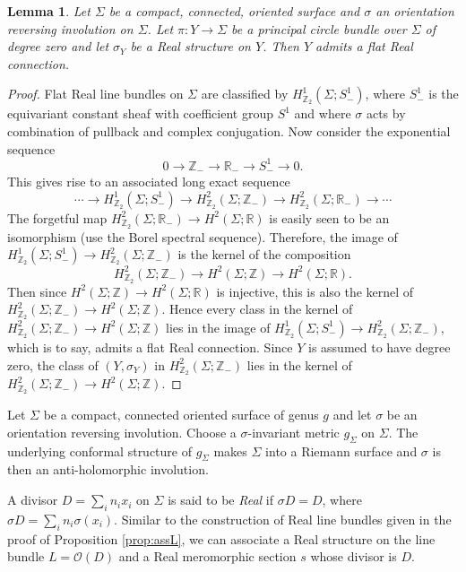 \documentclass{amsart}
\newtheorem{lemma}[theorem]{Lemma}
\theoremstyle{definition}
\theoremstyle{remark}
\numberwithin{equation}{section}
\begin{document}
\begin{lemma}\label{lem:flatreal}
Let $\Sigma$ be a compact, connected, oriented surface and $\sigma$ an orientation reversing involution on $\Sigma$. Let $\pi : Y \to \Sigma$ be a principal circle bundle over $\Sigma$ of degree zero and let $\sigma_Y$ be a Real structure on $Y$. Then $Y$ admits a flat Real connection.
\end{lemma}
\begin{proof}
Flat Real line bundles on $\Sigma$ are classified by $H^1_{\mathbb{Z}_2}(\Sigma ; S^1_-)$, where $S^1_-$ is the equivariant constant sheaf with coefficient group $S^1$ and where $\sigma$ acts by combination of pullback and complex conjugation. Now consider the exponential sequence
\[
0 \to \mathbb{Z}_- \to \mathbb{R}_- \to S^1_- \to 0.
\]
This gives rise to an associated long exact sequence
\[
\cdots \to H^1_{\mathbb{Z}_2}(\Sigma ; S^1_-) \to H^2_{\mathbb{Z}_2}(\Sigma ; \mathbb{Z}_-) \to H^2_{\mathbb{Z}_2}(\Sigma ; \mathbb{R}_-) \to \cdots
\]
The forgetful map $H^2_{\mathbb{Z}_2}(\Sigma ; \mathbb{R}_-) \to H^2(\Sigma ; \mathbb{R})$ is easily seen to be an isomorphism (use the Borel spectral sequence). Therefore, the image of $H^1_{\mathbb{Z}_2}(\Sigma ; S^1_-) \to H^2_{\mathbb{Z}_2}(\Sigma ; \mathbb{Z}_-)$ is the kernel of the composition 
\[
H^2_{\mathbb{Z}_2}(\Sigma ; \mathbb{Z}_-) \to H^2(\Sigma ; \mathbb{Z}) \to H^2(\Sigma ; \mathbb{R}).
\]
Then since $H^2(\Sigma ; \mathbb{Z}) \to H^2(\Sigma ; \mathbb{R})$ is injective, this is also the kernel of $H^2_{\mathbb{Z}_2}(\Sigma ; \mathbb{Z}_-) \to H^2(\Sigma ; \mathbb{Z})$. Hence every class in the kernel of $H^2_{\mathbb{Z}_2}(\Sigma ; \mathbb{Z}_-) \to H^2(\Sigma ; \mathbb{Z})$ lies in the image of $H^1_{\mathbb{Z}_2}(\Sigma ; S^1_-) \to H^2_{\mathbb{Z}_2}(\Sigma ; \mathbb{Z}_-)$, which is to say, admits a flat Real connection. Since $Y$ is assumed to have degree zero, the class of $(Y , \sigma_Y)$ in $H^2_{\mathbb{Z}_2}(\Sigma ; \mathbb{Z}_-)$ lies in the kernel of $H^2_{\mathbb{Z}_2}(\Sigma ; \mathbb{Z}_-) \to H^2(\Sigma ; \mathbb{Z})$.
\end{proof}

Let $\Sigma$ be a compact, connected oriented surface of genus $g$ and let $\sigma$ be an orientation reversing involution. Choose a $\sigma$-invariant metric $g_\Sigma$ on $\Sigma$. The underlying conformal structure of $g_\Sigma$ makes $\Sigma$ into a Riemann surface and $\sigma$ is then an anti-holomorphic involution.

A divisor $D = \sum_i n_i x_i$ on $\Sigma$ is said to be {\em Real} if $\sigma D = D$, where $\sigma D = \sum_i n_i \sigma(x_i)$. Similar to the construction of Real line bundles given in the proof of Proposition \ref{prop:assL}, we can associate a Real structure on the line bundle $L = \mathcal{O}(D)$ and a Real meromorphic section $s$ whose divisor is $D$.
\end{document}
